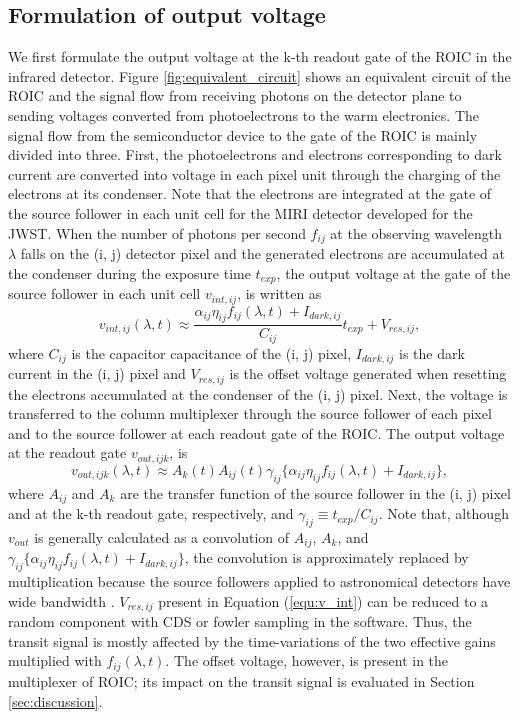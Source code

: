 \documentclass{aastex62}
\begin{document}
\subsection{Formulation of output voltage} \label{subsec:formulation}

We first formulate the output voltage at the k-th readout gate of the ROIC in the infrared detector. Figure \ref{fig:equivalent_circuit} shows an equivalent circuit of the ROIC \citep{2009ITED...56.2506J} and the signal flow from receiving photons on the detector plane to sending voltages converted from photoelectrons to the warm electronics. The signal flow from the semiconductor device to the gate of the ROIC is mainly divided into three. First, the photoelectrons and electrons corresponding to dark current are converted into voltage in each pixel unit through the charging of the electrons at its condenser. Note that the electrons are integrated at the gate of the source follower in each unit cell for the MIRI detector developed for the JWST. When the number of photons per second $f_{ij}$ at the observing wavelength $\lambda$ falls on the (i, j) detector pixel and the generated electrons are accumulated at the condenser during the exposure time $t_{exp}$, the output voltage at the gate of the source follower in each unit cell $v_{int,ij}$, is written as
\begin{equation}
\label{equ:v_int}
v_{int,ij}(\lambda,t) \approx \frac{\alpha_{ij}\eta_{ij}f_{ij}(\lambda,t)+I_{dark,ij}}{C_{ij}}t_{exp}+V_{res,ij} ,
\end{equation}
where $C_{ij}$ is the capacitor capacitance of the (i, j) pixel, $I_{dark,ij}$ is the dark current in the (i, j) pixel and $V_{res,ij}$ is the offset voltage generated when resetting the electrons accumulated at the condenser of the (i, j) pixel. Next, the voltage is transferred to the column multiplexer through the source follower of each pixel and to the source follower at each readout gate of the ROIC. The output voltage at the readout gate $v_{out,ijk}$, is
\begin{equation}
v_{out,ijk}(\lambda,t) \approx A_{k}(t)A_{ij}(t)\gamma_{ij}\{\alpha_{ij}\eta_{ij}f_{ij}(\lambda,t)+I_{dark,ij}\} ,
\end{equation}
where $A_{ij}$ and $A_k$ are the transfer function of the source follower in the (i, j) pixel and at the k-th readout gate, respectively, and $\gamma_{ij} \equiv t_{exp}/C_{ij}$. Note that, although $v_{out}$ is generally calculated as a convolution of $A_{ij}$, $A_{k}$, and $\gamma_{ij}\{\alpha_{ij}\eta_{ij}f_{ij}(\lambda,t)+I_{dark,ij}\}$, the convolution is approximately replaced by multiplication because the source followers applied to astronomical detectors have wide bandwidth \citep{1999ITED...46...96J, 2009ITED...56.2506J}. $V_{res,ij}$ present in Equation (\ref{equ:v_int}) can be reduced to a random component with CDS or fowler sampling in the software. Thus, the transit signal is mostly affected by the time-variations of the two effective gains multiplied with $f_{ij}(\lambda,t)$. The offset voltage, however, is present in the multiplexer of ROIC; its impact on the transit signal is evaluated in Section \ref{sec:discussion}.
\end{document}
